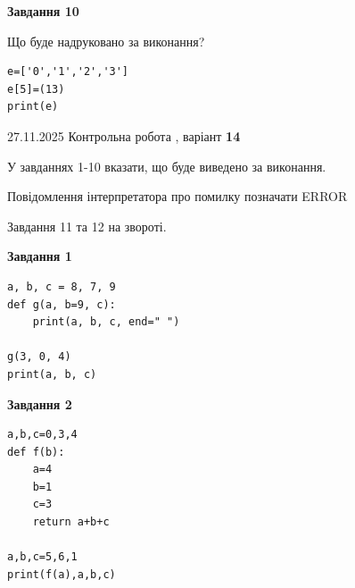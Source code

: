 \documentclass[12pt, ukrainian]{article}
\begin{document}
{{{{{{{{{{{{{{\begin{minipage}[t]{10.5cm}
\begin{center}
\textbf{Завдання 10}
\end{center}
Що буде надруковано за виконання?\par
\begin{verbatim}
e=['0','1','2','3']
e[5]=(13)
print(e)
\end{verbatim}

\end{minipage}

}
\newpage

{{ 27.11.2025 Контрольна робота , варіант  \No \textbf { 14 }\par}}
{

{%



У завданнях 1-10 вказати, що буде виведено за виконання.

Повідомлення інтерпретатора про помилку позначати ERROR

Завдання 11 та 12 на звороті.

\begin{minipage}[t]{7.5cm}

\begin{center}
\textbf{Завдання 1}
\end{center}

\begin{verbatim}
a, b, c = 8, 7, 9
def g(a, b=9, c):
    print(a, b, c, end=" ")

g(3, 0, 4)
print(a, b, c)
\end{verbatim}



\begin{center}
\textbf{Завдання 2}
\end{center}

\begin{verbatim}
a,b,c=0,3,4
def f(b):
    a=4
    b=1
    c=3
    return a+b+c

a,b,c=5,6,1
print(f(a),a,b,c)
\end{verbatim}




\end{minipage}}}}}}}}}}}}}}}}
\end{document}
